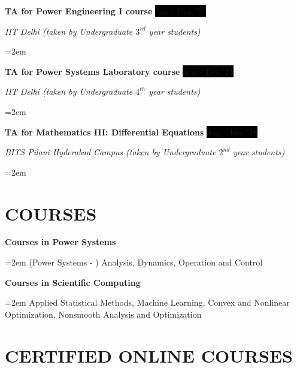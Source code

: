 \documentclass[paper=a4,fontsize=11pt]{scrartcl} %
\newcommand{\sepspace}{\vspace*{1em}}		%
\newcommand{\NewPart}[1]{\section*{\uppercase{#1}}}
\newcommand{\EducationEntry}[4]{
		\noindent \textbf{#1} \hfill      %
		\colorbox{Black}{%
			\parbox{10em}{%
			\hfill\color{White}#2}} \par  %
		\noindent \textit{#3} \par        %
		\noindent\hangindent=2em\hangafter=0 \small #4 %
		\normalsize \par}
\newcommand{\WorkEntry}[4]{				  %
		\noindent \textbf{#1} \hfill      %
		\colorbox{Black}{\color{White}#2} \par  %
		\noindent \textit{#3} \par              %
		\noindent\hangindent=2em\hangafter=0 \small #4 %
		\normalsize \par}
\begin{document}


\WorkEntry{TA for Power Engineering I course}{Jan - May '22}{IIT Delhi (taken by Undergraduate $3^{rd}$ year students)}{}
\sepspace

\WorkEntry{TA for Power Systems Laboratory course}{Aug - Dec '21}{IIT Delhi (taken by Undergraduate $4^{th}$ year students)}{}
\sepspace
\sepspace
\WorkEntry{TA for Mathematics III: Differential Equations}{Aug - Dec '18}{BITS Pilani Hyderabad Campus (taken by Undergraduate $2^{nd}$ year students)}{}

\clearpage

\NewPart{Courses}{}


\WorkEntry{Courses in Power Systems}{}{}{(Power Systems - ) Analysis, Dynamics, Operation and Control}
\sepspace
\WorkEntry{Courses in Scientific Computing}{}{}{Applied Statistical Methods, Machine Learning, Convex and Nonlinear Optimization, Nonsmooth Analysis and Optimization}
\NewPart{Certified Online Courses}{}
\end{document}
